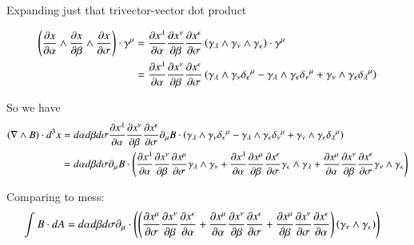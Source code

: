 Expanding just that trivector-vector dot product

\begin{align*}
\left( \frac{\partial {x}}{\partial {\alpha}} \wedge \frac{\partial {x}}{\partial {\beta}} \wedge \frac{\partial {x}}{\partial {\sigma}} \right) \cdot \gamma^\mu 
&=
\frac{\partial {x^\lambda}}{\partial {\alpha}} \frac{\partial {x^\nu}}{\partial {\beta}} \frac{\partial {x^\epsilon}}{\partial {\sigma}} \left( \gamma_\lambda \wedge \gamma_\nu \wedge \gamma_\epsilon \right) \cdot \gamma^\mu  \\
&=
\frac{\partial {x^\lambda}}{\partial {\alpha}} \frac{\partial {x^\nu}}{\partial {\beta}} \frac{\partial {x^\epsilon}}{\partial {\sigma}} \left( 
\gamma_\lambda \wedge \gamma_\nu {\delta_\epsilon}^\mu
-\gamma_\lambda \wedge \gamma_\epsilon {\delta_\nu}^\mu
+\gamma_\nu \wedge \gamma_\epsilon {\delta_\lambda}^\mu
\right) 
\end{align*}

So we have
\begin{align*}
(\nabla \wedge B) \cdot d^3 x
&=
d\alpha d\beta d\sigma \frac{\partial {x^\lambda}}{\partial {\alpha}} \frac{\partial {x^\nu}}{\partial {\beta}} \frac{\partial {x^\epsilon}}{\partial {\sigma}} \partial_\mu B \cdot \left( 
\gamma_\lambda \wedge \gamma_\nu {\delta_\epsilon}^\mu
-\gamma_\lambda \wedge \gamma_\epsilon {\delta_\nu}^\mu
+\gamma_\nu \wedge \gamma_\epsilon {\delta_\lambda}^\mu
\right) 
\\
&=
d\alpha d\beta d\sigma 
\partial_\mu B \cdot \left( 
  \frac{\partial {x^\lambda}}{\partial {\alpha}} \frac{\partial {x^\nu}}{\partial {\beta}} \frac{\partial {x^\mu}}{\partial {\sigma}} \gamma_\lambda \wedge \gamma_\nu 
+ \frac{\partial {x^\lambda}}{\partial {\alpha}} \frac{\partial {x^\mu}}{\partial {\beta}} \frac{\partial {x^\epsilon}}{\partial {\sigma}} \gamma_\epsilon \wedge \gamma_\lambda 
+ \frac{\partial {x^\mu}}{\partial {\alpha}} \frac{\partial {x^\nu}}{\partial {\beta}} \frac{\partial {x^\epsilon}}{\partial {\sigma}} \gamma_\nu \wedge \gamma_\epsilon 
\right) 
\\
\end{align*}

Comparing to mess:
\begin{align} %
\int B \cdot dA 
&=
d \alpha d\beta d\sigma 
\partial_\mu \cdot
\left(
\left(
  \PD{\sigma}{x^\mu} \PD{\beta}{x^\nu} \PD{\alpha}{x^\epsilon} 
+ \PD{\alpha}{x^\mu} \PD{\beta}{x^\nu} \PD{\sigma}{x^\epsilon} 
+ \PD{\beta}{x^\mu} \PD{\sigma}{x^\nu} \PD{\alpha}{x^\epsilon} 
\right) 
(\gamma_\nu \wedge \gamma_\epsilon )
\right) 
\end{align}

\EndNoBibArticle
